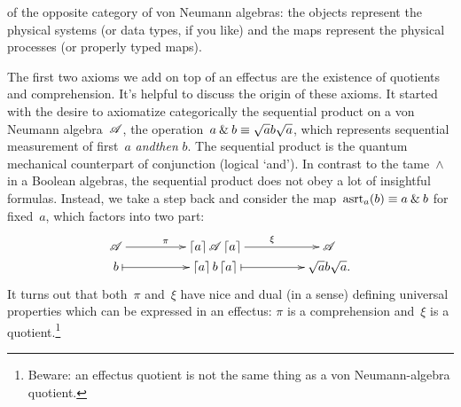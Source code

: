 \documentclass[b]{subfiles}
\begin{document}
\begin{parsec}
\begin{point}
    of the opposite category of von Neumann algebras:
    the objects represent the physical systems
    (or data types, if you like)
    and the maps represent the physical processes
    (or properly typed maps).
\end{point}
\begin{point}%
The first two axioms we add on top of an effectus
    are the existence of quotients and comprehension.
It's helpful to discuss the origin of these axioms.
It started with the desire to axiomatize categorically
    the sequential product on a von Neumann algebra~$\mathscr{A}$,
    the operation~$a \mathbin{\&} b \equiv  \sqrt{a} b \sqrt{a}$,
    which represents sequential measurement
    of first~$a$ \emph{andthen} $b$.
The sequential product is the quantum mechanical counterpart
    of conjunction (logical `and').
In  contrast to the tame~$\wedge$ in a Boolean algebras,
    the sequential product does not obey a lot of insightful
    formulas.
Instead, we take a step back and
    consider the map~$\mathrm{asrt}_a(b) \equiv  a \mathbin{\&} b$
        for fixed~$a$, which factors into two part:
\begin{equation*}
    \xymatrix@C+2pc@R-2pc{
        \scrA \ar[r]^\pi & \ceil{a} \scrA \ceil{a} \ar[r]^\xi
        & \scrA \\
        b \ar@{|->}[r] & \ceil{a}b\ceil{a}
            \ar@{|->}[r] & \sqrt{a}b\sqrt{a}.
    }
\end{equation*}
It turns out that both~$\pi$ and~$\xi$ have
    nice and dual (in a sense) defining universal properties
    which can be expressed in an effectus:
    $\pi$ is a comprehension and~$\xi$ is a quotient.\footnote{%
            Beware: an effectus quotient is not the same thing
        as a von Neumann-algebra quotient.}
\end{point}
\end{parsec}
\end{document}
